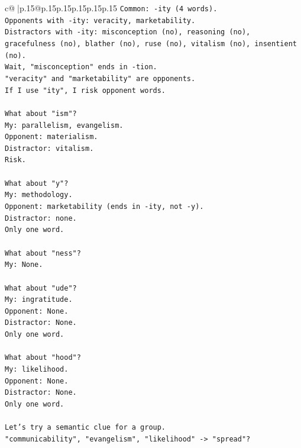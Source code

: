 \documentclass{article}
\begin{document}
{\begin{supertabular}{c@{$\;$}|p{.15\linewidth}@{}p{.15\linewidth}p{.15\linewidth}p{.15\linewidth}p{.15\linewidth}p{.15\linewidth}}
{{{\texttt{Common: {-}ity (4 words).} \\
\texttt{Opponents with {-}ity: veracity, marketability.} \\
\texttt{Distractors with {-}ity: misconception (no), reasoning (no), gracefulness (no), blather (no), ruse (no), vitalism (no), insentient (no).} \\
\texttt{Wait, "misconception" ends in {-}tion.} \\
\texttt{"veracity" and "marketability" are opponents.} \\
\texttt{If I use "ity", I risk opponent words.} \\
\\ 
\texttt{What about "ism"?} \\
\texttt{My: parallelism, evangelism.} \\
\texttt{Opponent: materialism.} \\
\texttt{Distractor: vitalism.} \\
\texttt{Risk.} \\
\\ 
\texttt{What about "y"?} \\
\texttt{My: methodology.} \\
\texttt{Opponent: marketability (ends in {-}ity, not {-}y).} \\
\texttt{Distractor: none.} \\
\texttt{Only one word.} \\
\\ 
\texttt{What about "ness"?} \\
\texttt{My: None.} \\
\\ 
\texttt{What about "ude"?} \\
\texttt{My: ingratitude.} \\
\texttt{Opponent: None.} \\
\texttt{Distractor: None.} \\
\texttt{Only one word.} \\
\\ 
\texttt{What about "hood"?} \\
\texttt{My: likelihood.} \\
\texttt{Opponent: None.} \\
\texttt{Distractor: None.} \\
\texttt{Only one word.} \\
\\ 
\texttt{Let's try a semantic clue for a group.} \\
\texttt{"communicability", "evangelism", "likelihood" {-}> "spread"?} \\
}}}
\end{supertabular}}
\end{document}
